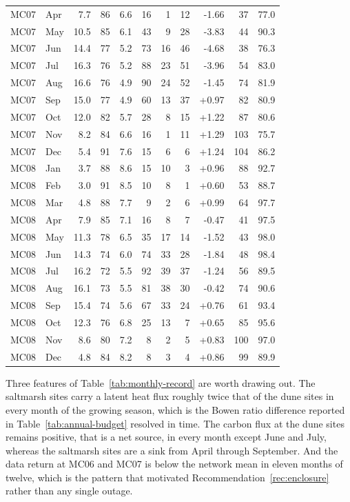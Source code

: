 \begin{longtable}{llrrrrrrrrr}
MC07 & Apr & 7.7 & 86 & 6.6 & 16 & 1 & 12 & -1.66 & 37 & 77.0 \\
MC07 & May & 10.5 & 85 & 6.1 & 43 & 9 & 28 & -3.83 & 44 & 90.3 \\
MC07 & Jun & 14.4 & 77 & 5.2 & 73 & 16 & 46 & -4.68 & 38 & 76.3 \\
MC07 & Jul & 16.3 & 76 & 5.2 & 88 & 23 & 51 & -3.96 & 54 & 83.0 \\
MC07 & Aug & 16.6 & 76 & 4.9 & 90 & 24 & 52 & -1.45 & 74 & 81.9 \\
MC07 & Sep & 15.0 & 77 & 4.9 & 60 & 13 & 37 & +0.97 & 82 & 80.9 \\
MC07 & Oct & 12.0 & 82 & 5.7 & 28 & 8 & 15 & +1.22 & 87 & 80.6 \\
MC07 & Nov & 8.2 & 84 & 6.6 & 16 & 1 & 11 & +1.29 & 103 & 75.7 \\
MC07 & Dec & 5.4 & 91 & 7.6 & 15 & 6 & 6 & +1.24 & 104 & 86.2 \\
\midrule
MC08 & Jan & 3.7 & 88 & 8.6 & 15 & 10 & 3 & +0.96 & 88 & 92.7 \\
MC08 & Feb & 3.0 & 91 & 8.5 & 10 & 8 & 1 & +0.60 & 53 & 88.7 \\
MC08 & Mar & 4.8 & 88 & 7.7 & 9 & 2 & 6 & +0.99 & 64 & 97.7 \\
MC08 & Apr & 7.9 & 85 & 7.1 & 16 & 8 & 7 & -0.47 & 41 & 97.5 \\
MC08 & May & 11.3 & 78 & 6.5 & 35 & 17 & 14 & -1.52 & 43 & 98.0 \\
MC08 & Jun & 14.3 & 74 & 6.0 & 74 & 33 & 28 & -1.84 & 48 & 98.4 \\
MC08 & Jul & 16.2 & 72 & 5.5 & 92 & 39 & 37 & -1.24 & 56 & 89.5 \\
MC08 & Aug & 16.1 & 73 & 5.5 & 81 & 38 & 30 & -0.42 & 74 & 90.6 \\
MC08 & Sep & 15.4 & 74 & 5.6 & 67 & 33 & 24 & +0.76 & 61 & 93.4 \\
MC08 & Oct & 12.3 & 76 & 6.8 & 25 & 13 & 7 & +0.65 & 85 & 95.6 \\
MC08 & Nov & 8.6 & 80 & 7.2 & 8 & 2 & 5 & +0.83 & 100 & 97.0 \\
MC08 & Dec & 4.8 & 84 & 8.2 & 8 & 3 & 4 & +0.86 & 99 & 89.9 \\
\end{longtable}
\endgroup

Three features of Table~\ref{tab:monthly-record} are worth drawing out. The
saltmarsh sites carry a latent heat flux roughly twice that of the dune sites in
every month of the growing season, which is the Bowen ratio difference reported
in Table~\ref{tab:annual-budget} resolved in time. The carbon flux at the dune
sites remains positive, that is a net source, in every month except June and
July, whereas the saltmarsh sites are a sink from April through September. And
the data return at MC06 and MC07 is below the network mean in eleven months of
twelve, which is the pattern that motivated
Recommendation~\ref{rec:enclosure} rather than any single outage.
